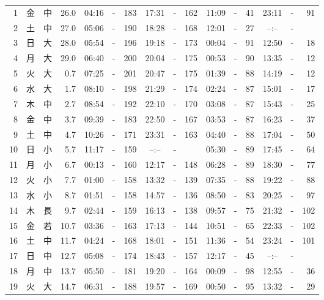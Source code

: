 \documentclass[12pt.a4j]{jsarticle}
\begin{document}
\begin{center}
\begin{table}[ht]
\begin{tabular}{|rc|cr|ccrccr|ccrccr|}
 \hline
 1 & 金 & 中 & 26.0 &  04:16 &-& 183  &  17:31 &-& 162  &   11:09 &-&  41  &   23:11 &-&  91  \\
 2 & 土 & 中 & 27.0 &  05:06 &-& 190  &  18:28 &-& 168  &   12:01 &-&  27  &   --:-- &-&     \\
 3 & 日 & 大 & 28.0 &  05:54 &-& 196  &  19:18 &-& 173  &   00:04 &-&  91  &   12:50 &-&  18  \\
 4 & 月 & 大 & 29.0 &  06:40 &-& 200  &  20:04 &-& 175  &   00:53 &-&  90  &   13:35 &-&  12  \\
 5 & 火 & 大 &  0.7 &  07:25 &-& 201  &  20:47 &-& 175  &   01:39 &-&  88  &   14:19 &-&  12  \\
 6 & 水 & 大 &  1.7 &  08:10 &-& 198  &  21:29 &-& 174  &   02:24 &-&  87  &   15:01 &-&  17  \\
 7 & 木 & 中 &  2.7 &  08:54 &-& 192  &  22:10 &-& 170  &   03:08 &-&  87  &   15:43 &-&  25  \\
 8 & 金 & 中 &  3.7 &  09:39 &-& 183  &  22:50 &-& 167  &   03:53 &-&  87  &   16:23 &-&  37  \\
 9 & 土 & 中 &  4.7 &  10:26 &-& 171  &  23:31 &-& 163  &   04:40 &-&  88  &   17:04 &-&  50  \\
10 & 日 & 小 &  5.7 &  11:17 &-& 159  &  --:-- &-&     &   05:30 &-&  89  &   17:45 &-&  64  \\
11 & 月 & 小 &  6.7 &  00:13 &-& 160  &  12:17 &-& 148  &   06:28 &-&  89  &   18:30 &-&  77  \\
12 & 火 & 小 &  7.7 &  01:00 &-& 158  &  13:32 &-& 139  &   07:35 &-&  88  &   19:22 &-&  88  \\
13 & 水 & 小 &  8.7 &  01:51 &-& 158  &  14:57 &-& 136  &   08:50 &-&  83  &   20:25 &-&  97  \\
14 & 木 & 長 &  9.7 &  02:44 &-& 159  &  16:13 &-& 138  &   09:57 &-&  75  &   21:32 &-& 102  \\
15 & 金 & 若 & 10.7 &  03:36 &-& 163  &  17:13 &-& 144  &   10:51 &-&  65  &   22:33 &-& 102  \\
16 & 土 & 中 & 11.7 &  04:24 &-& 168  &  18:01 &-& 151  &   11:36 &-&  54  &   23:24 &-& 101  \\
17 & 日 & 中 & 12.7 &  05:08 &-& 174  &  18:43 &-& 157  &   12:17 &-&  45  &   --:-- &-&     \\
18 & 月 & 中 & 13.7 &  05:50 &-& 181  &  19:20 &-& 164  &   00:09 &-&  98  &   12:55 &-&  36  \\
19 & 火 & 大 & 14.7 &  06:31 &-& 188  &  19:57 &-& 169  &   00:50 &-&  95  &   13:32 &-&  29  \\

\end{tabular}
\end{table}
\end{center}
\end{document}
